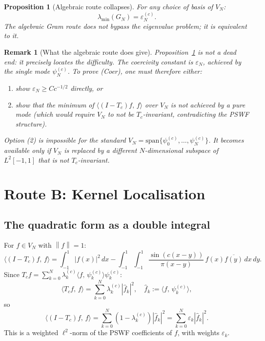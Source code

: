 \documentclass[12pt,a4paper]{article}
\newtheorem{proposition}[theorem]{Proposition}
\newtheorem{remark}[theorem]{Remark}
\newcommand{\lam}[1]{\lambda_{#1}^{(c)}}
\newcommand{\pswf}[1]{\psi_{#1}^{(c)}}
\newcommand{\Tc}{T_c}
\newcommand{\VN}{V_N}
\newcommand{\GN}{G_N}
\newcommand{\inner}[2]{\langle #1,\, #2 \rangle}
\newcommand{\norm}[1]{\left\|#1\right\|}
\begin{document}
\begin{proposition}[Algebraic route collapses]
\label{prop:gram_collapse}
For any choice of basis of $\VN$:
\[
  \lambda_{\min}(\GN) = \varepsilon_N^{(c)}.
\]
The algebraic Gram route does not bypass the
eigenvalue problem; it is equivalent to it.
\end{proposition}

\begin{remark}[What the algebraic route does give]
Proposition~\ref{prop:gram_collapse} is not a
dead end: it precisely locates the difficulty.
The coercivity constant is $\varepsilon_N$,
achieved by the single mode $\pswf{N}$.
To prove (Coer), one must therefore either:
\begin{enumerate}[nosep]
  \item show $\varepsilon_N \geq Cc^{-1/2}$ directly, or
  \item show that the minimum of
        $\inner{(I-\Tc)f}{f}$ over $\VN$
        is \emph{not} achieved by a pure mode
        (which would require $\VN$ to not be
        $\Tc$-invariant, contradicting the PSWF structure).
\end{enumerate}
Option (2) is impossible for the standard $\VN
= \mathrm{span}\{\pswf{0},\ldots,\pswf{N}\}$.
It becomes available only if $\VN$ is replaced by
a \emph{different} $N$-dimensional subspace of $L^2[-1,1]$
that is not $\Tc$-invariant.
\end{remark}

\section{Route B: Kernel Localisation}
\label{sec:kernel}

\subsection{The quadratic form as a double integral}

For $f \in \VN$ with $\norm{f} = 1$:
\[
  \inner{(I-\Tc)f}{f}
  = \int_{-1}^{1} |f(x)|^2\,dx
  - \int_{-1}^{1}\int_{-1}^{1}
    \frac{\sin(c(x-y))}{\pi(x-y)}\,
    f(x)\overline{f(y)}\,dx\,dy.
\]
Since $\Tc f = \sum_{k=0}^N \lam{k}
\inner{f}{\pswf{k}}\pswf{k}$:
\[
  \inner{\Tc f}{f}
  = \sum_{k=0}^N \lam{k} |\hat f_k|^2,
  \quad \hat f_k := \inner{f}{\pswf{k}},
\]
so
\[
  \inner{(I-\Tc)f}{f}
  = \sum_{k=0}^N (1-\lam{k})|\hat f_k|^2
  = \sum_{k=0}^N \varepsilon_k |\hat f_k|^2.
\]
This is a weighted $\ell^2$-norm of the PSWF
coefficients of $f$, with weights $\varepsilon_k$.
\end{document}

